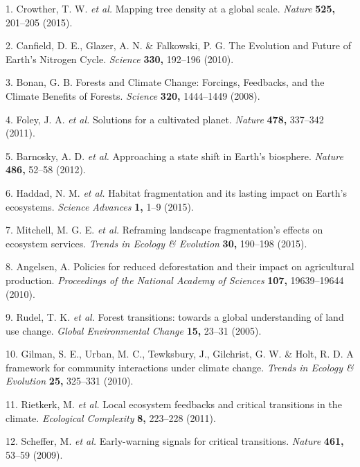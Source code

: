 \documentclass[]{article}
\begin{document}
\hypertarget{refs}{}
\hypertarget{ref-Crowther2015a}{}
1. Crowther, T. W. \emph{et al.} Mapping tree density at a global scale.
\emph{Nature} \textbf{525,} 201--205 (2015).

\hypertarget{ref-Canfield2010}{}
2. Canfield, D. E., Glazer, A. N. \& Falkowski, P. G. The Evolution and
Future of Earth's Nitrogen Cycle. \emph{Science} \textbf{330,} 192--196
(2010).

\hypertarget{ref-Bonan2008}{}
3. Bonan, G. B. Forests and Climate Change: Forcings, Feedbacks, and the
Climate Benefits of Forests. \emph{Science} \textbf{320,} 1444--1449
(2008).

\hypertarget{ref-Foley2011}{}
4. Foley, J. A. \emph{et al.} Solutions for a cultivated planet.
\emph{Nature} \textbf{478,} 337--342 (2011).

\hypertarget{ref-Barnosky2012}{}
5. Barnosky, A. D. \emph{et al.} Approaching a state shift in Earth's
biosphere. \emph{Nature} \textbf{486,} 52--58 (2012).

\hypertarget{ref-Haddad2015}{}
6. Haddad, N. M. \emph{et al.} Habitat fragmentation and its lasting
impact on Earth's ecosystems. \emph{Science Advances} \textbf{1,} 1--9
(2015).

\hypertarget{ref-Mitchell2015}{}
7. Mitchell, M. G. E. \emph{et al.} Reframing landscape fragmentation's
effects on ecosystem services. \emph{Trends in Ecology \& Evolution}
\textbf{30,} 190--198 (2015).

\hypertarget{ref-Angelsen2010}{}
8. Angelsen, A. Policies for reduced deforestation and their impact on
agricultural production. \emph{Proceedings of the National Academy of
Sciences} \textbf{107,} 19639--19644 (2010).

\hypertarget{ref-Rudel2005}{}
9. Rudel, T. K. \emph{et al.} Forest transitions: towards a global
understanding of land use change. \emph{Global Environmental Change}
\textbf{15,} 23--31 (2005).

\hypertarget{ref-Gilman2010}{}
10. Gilman, S. E., Urban, M. C., Tewksbury, J., Gilchrist, G. W. \&
Holt, R. D. A framework for community interactions under climate change.
\emph{Trends in Ecology \& Evolution} \textbf{25,} 325--331 (2010).

\hypertarget{ref-Rietkerk2011}{}
11. Rietkerk, M. \emph{et al.} Local ecosystem feedbacks and critical
transitions in the climate. \emph{Ecological Complexity} \textbf{8,}
223--228 (2011).

\hypertarget{ref-Scheffer2009}{}
12. Scheffer, M. \emph{et al.} Early-warning signals for critical
transitions. \emph{Nature} \textbf{461,} 53--59 (2009).
\end{document}
